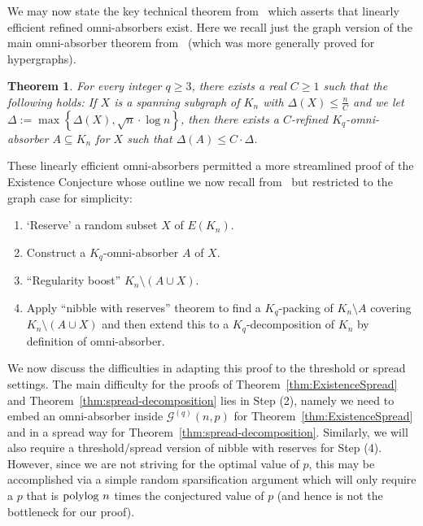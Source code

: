 \documentclass[11pt]{article}
\numberwithin{equation}{section}
\newcounter{i}
\theoremstyle{plain}
\newtheorem{thm}{Theorem}[section]
\theoremstyle{plain} %
\theoremstyle{definition}
\begin{document}
We may now state the key technical theorem from~\cite{DPI} which asserts that linearly efficient refined omni-absorbers exist. %
Here we recall just the graph version of the main omni-absorber theorem from~\cite{DPI} (which was more generally proved for hypergraphs).

\begin{thm}\label{thm:omni-absorber}
    For every integer $q \ge 3$, there exists a real $C\ge 1$ such that the following holds: If $X$ is a spanning subgraph of $K_n$ with $\Delta(X) \le \frac{n}{C}$ and we let $\Delta:= \max\left\{\Delta(X),\sqrt{n}\cdot \log n\right\}$, then there exists a $C$-refined $K_q$-omni-absorber $A \subseteq K_n$ for $X$ such that $\Delta(A)\le C \cdot \Delta$.
\end{thm}

\noindent
These linearly efficient omni-absorbers permitted a more streamlined proof of the Existence Conjecture whose outline we now recall from~\cite{DPI} but restricted to the graph case for simplicity:

\begin{enumerate}
    \item[(1)] `Reserve' a random subset $X$ of $E(K_n)$.
    \item[(2)] Construct a $K_q$-omni-absorber $A$ of $X$.
    \item[(3)] ``Regularity boost'' $K_n\setminus (A\cup X)$.
    \item[(4)] Apply ``nibble with reserves'' theorem to find a $K_q$-packing of $K_n\setminus A$ covering $K_n\setminus (A\cup X)$ and then extend this to a $K_q$-decomposition of $K_n$ by definition of omni-absorber.  
\end{enumerate}

We now discuss the difficulties in adapting this proof to the threshold or spread settings. The main difficulty for the proofs of Theorem~\ref{thm:ExistenceSpread} and Theorem~\ref{thm:spread-decomposition} lies in Step (2), namely we need to embed an omni-absorber inside $\mathcal{G}^{(q)}(n,p)$ for Theorem~\ref{thm:ExistenceSpread} and in a spread way for Theorem~\ref{thm:spread-decomposition}. Similarly, we will also require a threshold/spread version of nibble with reserves for Step (4). However, since we are not striving for the optimal value of $p$, this may be accomplished via a simple random sparsification argument which will only require a $p$ that is ${\rm polylog}~n$ times the conjectured value of $p$ (and hence is not the bottleneck for our proof).
\end{document}
